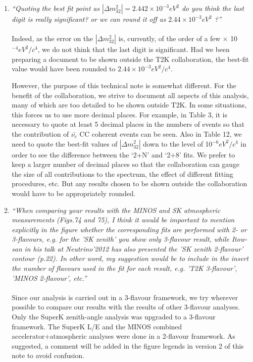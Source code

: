 \begin{enumerate}
\vspace{5 mm}
\item
{\em
   ``Quoting the best fit point as 
   $|\Delta m^2_{32}| = 2.442 \times 10^{-3} eV^2$ do you think the 
   last digit is really significant? or we can round it off as $2.44 \times 10^{-3} eV^2$ ?''
}\\
\\
Indeed, as the error on the $|\Delta m^2_{32}|$ is, currently,
of the order of a few $\times$ 10$^{-4} eV^2/c^4$,
we do not think that the last digit is significant.
Had we been preparing a document to be shown outside the T2K collaboration,
the best-fit value would have been rounded to $2.44 \times 10^{-3} eV^2/c^4$.

However, the purpose of this technical note is somewhat different.
For the benefit of the collaboration, we strive to document all aspects of this analysis,
many of which are too detailed to be shown outside T2K.
In some situations, this forces us to use more decimal places.
For example, in Table 3, it is necessary to quote at least 5 decimal places in the numbers of events
so that the contribution of $\bar{\nu_{e}}$ CC coherent events can be seen.
Also in Table 12, we need to quote the best-fit values of $|\Delta m^2_{32}|$ down to the level of
10$^{-6} eV^2/c^4$ in order to see the difference between the `2+N' and `2+8' fits.
We prefer to keep a larger number of decimal places
so that the collaboration can gauge the size of all contributions to the spectrum,
the effect of different fitting procedures, etc.
But any results chosen to be shown outside the collaboration would have to be appropriately rounded.

\vspace{5 mm}
\item
{\em
   ``When comparing your results with the MINOS and SK atmospheric measurements (Figs.74 and 75), 
   I think it would be important to mention explicitly in the figure whether the corresponding fits 
   are performed with 2- or 3-flavours, e.g. for the 'SK zenith' you show only 3-flavour result,
   while Itow-san in his talk at Neutrino'2012 has also presented the 'SK zenith 2-flavour' contour (p.22). 
   In other word, my suggestion would be to include in the insert the number of flavours used in the 
   fit for each result, e.g. 'T2K 3-flavour', 'MINOS 2-flavour', etc.''
}\\
\\
Since our analysis is carried out in a 3-flavour framework, we try wherever possible to compare our results
with the results of other 3-flavour analyses.
Only the SuperK zenith-angle analysis was upgraded to a 3-flavour framework.
The SuperK L/E and the MINOS combined accelerator+atmospheric analyses were done in a 2-flavour framework.
As suggested, a comment will be added in the figure legends in version 2 of this note to avoid confusion.


\end{enumerate}
